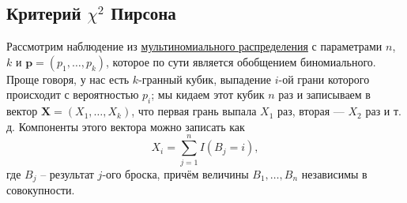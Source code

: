\subsection{Критерий $\chi^2$ Пирсона}\label{pearson_chi2_test}

Рассмотрим наблюдение из \href{https://en.wikipedia.org/wiki/Multinomial_distribution}{мультиномиального распределения} с параметрами $n$, $k$ и $\mathbf{p} = (p_1, \ldots, p_k)$, которое по сути является обобщением биномиального. Проще говоря, у нас есть $k$-гранный кубик, выпадение $i$-ой грани которого происходит с вероятностью $p_i$; мы кидаем этот кубик $n$ раз и записываем в вектор $\mathbf X = (X_1, \ldots, X_k)$, что первая грань выпала $X_1$ раз, вторая --- $X_2$ раз и т. д. Компоненты этого вектора можно записать как
\[
X_i = \sum_{j=1}^n I(B_j = i),
\]
где $B_j$ -- результат $j$-ого броска, причём величины $B_1, \ldots, B_n$ независимы в совокупности.

